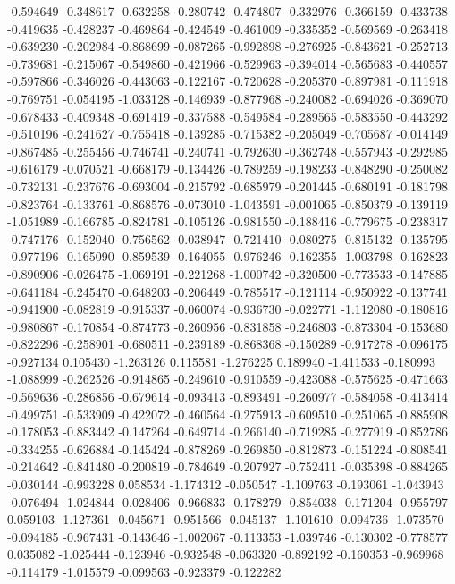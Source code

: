 -0.594649
-0.348617
-0.632258
-0.280742
-0.474807
-0.332976
-0.366159
-0.433738
-0.419635
-0.428237
-0.469864
-0.424549
-0.461009
-0.335352
-0.569569
-0.263418
-0.639230
-0.202984
-0.868699
-0.087265
-0.992898
-0.276925
-0.843621
-0.252713
-0.739681
-0.215067
-0.549860
-0.421966
-0.529963
-0.394014
-0.565683
-0.440557
-0.597866
-0.346026
-0.443063
-0.122167
-0.720628
-0.205370
-0.897981
-0.111918
-0.769751
-0.054195
-1.033128
-0.146939
-0.877968
-0.240082
-0.694026
-0.369070
-0.678433
-0.409348
-0.691419
-0.337588
-0.549584
-0.289565
-0.583550
-0.443292
-0.510196
-0.241627
-0.755418
-0.139285
-0.715382
-0.205049
-0.705687
-0.014149
-0.867485
-0.255456
-0.746741
-0.240741
-0.792630
-0.362748
-0.557943
-0.292985
-0.616179
-0.070521
-0.668179
-0.134426
-0.789259
-0.198233
-0.848290
-0.250082
-0.732131
-0.237676
-0.693004
-0.215792
-0.685979
-0.201445
-0.680191
-0.181798
-0.823764
-0.133761
-0.868576
-0.073010
-1.043591
-0.001065
-0.850379
-0.139119
-1.051989
-0.166785
-0.824781
-0.105126
-0.981550
-0.188416
-0.779675
-0.238317
-0.747176
-0.152040
-0.756562
-0.038947
-0.721410
-0.080275
-0.815132
-0.135795
-0.977196
-0.165090
-0.859539
-0.164055
-0.976246
-0.162355
-1.003798
-0.162823
-0.890906
-0.026475
-1.069191
-0.221268
-1.000742
-0.320500
-0.773533
-0.147885
-0.641184
-0.245470
-0.648203
-0.206449
-0.785517
-0.121114
-0.950922
-0.137741
-0.941900
-0.082819
-0.915337
-0.060074
-0.936730
-0.022771
-1.112080
-0.180816
-0.980867
-0.170854
-0.874773
-0.260956
-0.831858
-0.246803
-0.873304
-0.153680
-0.822296
-0.258901
-0.680511
-0.239189
-0.868368
-0.150289
-0.917278
-0.096175
-0.927134
0.105430
-1.263126
0.115581
-1.276225
0.189940
-1.411533
-0.180993
-1.088999
-0.262526
-0.914865
-0.249610
-0.910559
-0.423088
-0.575625
-0.471663
-0.569636
-0.286856
-0.679614
-0.093413
-0.893491
-0.260977
-0.584058
-0.413414
-0.499751
-0.533909
-0.422072
-0.460564
-0.275913
-0.609510
-0.251065
-0.885908
-0.178053
-0.883442
-0.147264
-0.649714
-0.266140
-0.719285
-0.277919
-0.852786
-0.334255
-0.626884
-0.145424
-0.878269
-0.269850
-0.812873
-0.151224
-0.808541
-0.214642
-0.841480
-0.200819
-0.784649
-0.207927
-0.752411
-0.035398
-0.884265
-0.030144
-0.993228
0.058534
-1.174312
-0.050547
-1.109763
-0.193061
-1.043943
-0.076494
-1.024844
-0.028406
-0.966833
-0.178279
-0.854038
-0.171204
-0.955797
0.059103
-1.127361
-0.045671
-0.951566
-0.045137
-1.101610
-0.094736
-1.073570
-0.094185
-0.967431
-0.143646
-1.002067
-0.113353
-1.039746
-0.130302
-0.778577
0.035082
-1.025444
-0.123946
-0.932548
-0.063320
-0.892192
-0.160353
-0.969968
-0.114179
-1.015579
-0.099563
-0.923379
-0.122282

